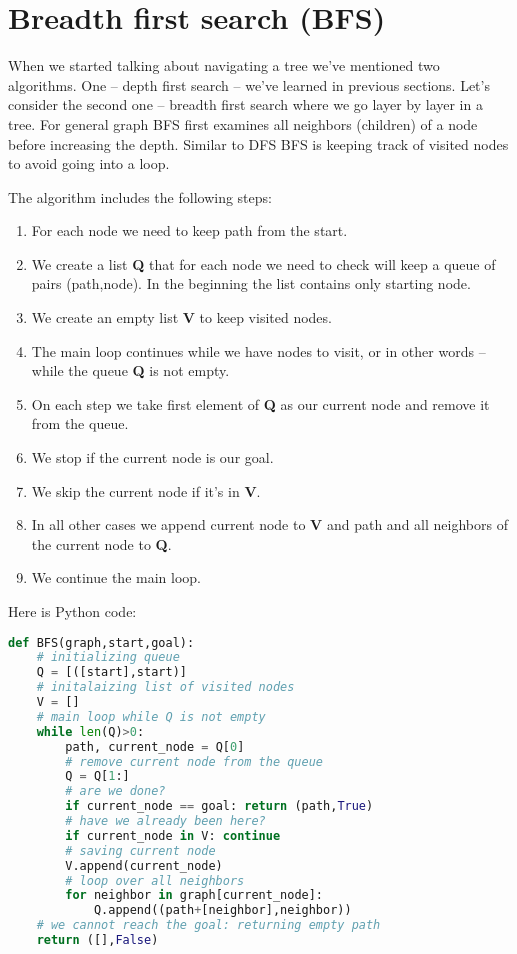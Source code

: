 \section{Breadth first search (BFS)}

When we started talking about navigating a tree we've mentioned
two algorithms. One -- depth first search -- we've learned in
previous sections. Let's consider the second one -- breadth first
search where we go layer by layer in a tree. For general graph
BFS first examines all neighbors (children) of a node before
increasing the depth. Similar to DFS BFS is keeping track of
visited nodes to avoid going into a loop.

The algorithm includes the following steps:

\begin{enumerate}
\item For each node we need to keep path from the start.
\item We create a list \textbf{Q} that for each node we need to check
will keep a queue of pairs (path,node). In the beginning the list contains
only starting node.
\item We create an empty list \textbf{V} to keep visited nodes.
\item The main loop continues while we have nodes to visit, or
in other words -- while the queue \textbf{Q} is not empty.
\item On each step we take first element of \textbf{Q} as our
current node and remove it from the queue.
\item We stop if the current node is our goal.
\item We skip the current node if it's in \textbf{V}.
\item In all other cases we append current node to \textbf{V} and
path and all neighbors of the current node to \textbf{Q}.
\item We continue the main loop.
\end{enumerate}

Here is Python code:

\begin{lstlisting}[language=Python,style=codelst,caption={Python: Breadth first search}]
def BFS(graph,start,goal):
    # initializing queue
    Q = [([start],start)]
    # initalaizing list of visited nodes
    V = []
    # main loop while Q is not empty
    while len(Q)>0:
        path, current_node = Q[0]
        # remove current node from the queue
        Q = Q[1:]
        # are we done?
        if current_node == goal: return (path,True)
        # have we already been here?
        if current_node in V: continue
        # saving current node
        V.append(current_node)
        # loop over all neighbors
        for neighbor in graph[current_node]:
            Q.append((path+[neighbor],neighbor))
    # we cannot reach the goal: returning empty path
    return ([],False)
\end{lstlisting}

